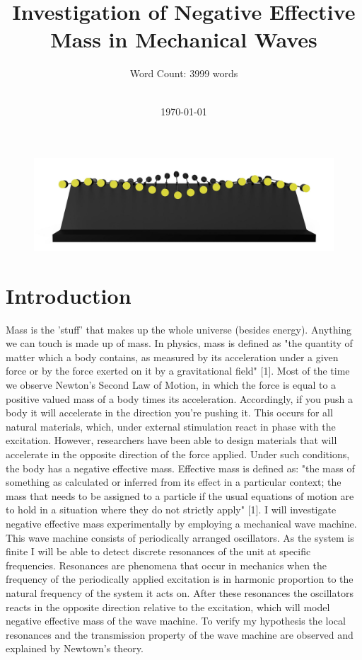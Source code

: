 \documentclass[12pt]{article}
\title{Investigation of Negative Effective Mass in Mechanical Waves}
\author{Word Count: 3999 words\\\\}
\date{\today}
\begin{document}
\maketitle
\begin{figure}[hbt]
	\includegraphics[width=\textwidth]{mechanical_wave_machine.jpg}
\end{figure}

\clearpage

\setcounter{page}{2}                    %
\tableofcontents 
\clearpage                       %

\section{Introduction} 
Mass is the 'stuff' that makes up the whole universe (besides energy). Anything we can touch is made up of mass. In physics, mass is defined as "the quantity of matter which a body contains, as measured by its acceleration under a given force or by the force exerted on it by a gravitational field" [1]. Most of the time we observe Newton's Second Law of Motion, in which the force is equal to a positive valued mass of a body times its acceleration. Accordingly, if you push a body it will accelerate in the direction you're pushing it. This occurs for all natural materials, which, under external stimulation react in phase with the excitation. However, researchers have been able to design materials that will accelerate in the opposite direction of the force applied. Under such conditions, the body has a negative effective mass. Effective mass is defined as: "the mass of something as calculated or inferred from its effect in a particular context; the mass that needs to be assigned to a particle if the usual equations of motion are to hold in a situation where they do not strictly apply" [1]. I will investigate negative effective mass experimentally by employing a mechanical wave machine. This wave machine consists of periodically arranged oscillators. As the system is finite I will be able to detect discrete resonances of the unit at specific frequencies. Resonances are phenomena that occur in mechanics when the frequency of the periodically applied excitation is in harmonic proportion to the natural frequency of the system it acts on. After these resonances the oscillators reacts in the opposite direction relative to the excitation, which will model negative effective mass of the wave machine. To verify my hypothesis the local resonances and the transmission property of the wave machine are observed and explained by Newtown's theory.
 
\end{document}
